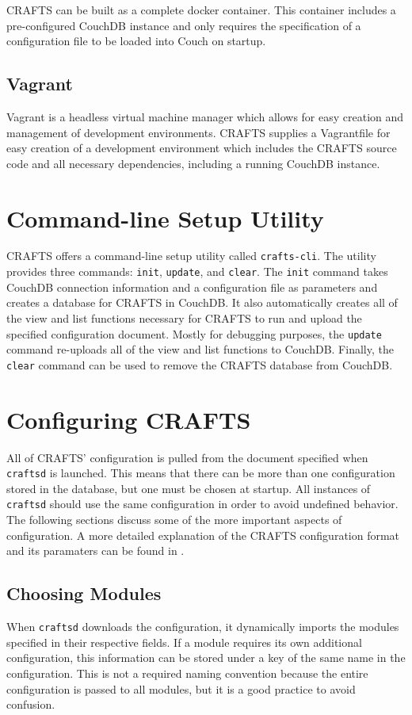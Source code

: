 CRAFTS can be built as a complete docker container. This container includes a pre-configured CouchDB instance and only requires the specification of a configuration file to be loaded into Couch on startup.

\subsection{Vagrant}
Vagrant is a headless virtual machine manager which allows for easy creation and management of development environments. CRAFTS supplies a Vagrantfile for easy creation of a development environment which includes the CRAFTS source code and all necessary dependencies, including a running CouchDB instance.

\section{Command-line Setup Utility}
CRAFTS offers a command-line setup utility called \texttt{crafts-cli}. The utility provides three commands: \texttt{init}, \texttt{update}, and \texttt{clear}. The \texttt{init} command takes CouchDB connection information and a configuration file as parameters and creates a database for CRAFTS in CouchDB. It also automatically creates all of the view and list functions necessary for CRAFTS to run and upload the specified configuration document. Mostly for debugging purposes, the \texttt{update} command re-uploads all of the view and list functions to CouchDB. Finally, the \texttt{clear} command can be used to remove the CRAFTS database from CouchDB.

\section{Configuring CRAFTS}
All of CRAFTS' configuration is pulled from the document specified when \texttt{craftsd} is launched. This means that there can be more than one configuration stored in the database, but one must be chosen at startup. All instances of \texttt{craftsd} should use the same configuration in order to avoid undefined behavior. The following sections discuss some of the more important aspects of configuration. A more detailed explanation of the CRAFTS configuration format and its paramaters can be found in .

\subsection{Choosing Modules}
When \texttt{craftsd} downloads the configuration, it dynamically imports the modules specified in their respective fields. If a module requires its own additional configuration, this information can be stored under a key of the same name in the configuration. This is not a required naming convention because the entire configuration is passed to all modules, but it is a good practice to avoid confusion.

